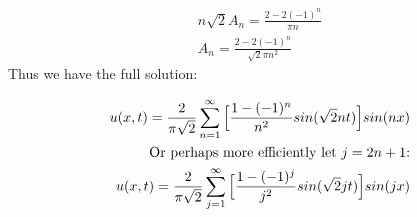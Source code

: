 \documentclass{article}
\begin{document}
\begin{equation}
\begin{aligned}
n\sqrt{2}A_n  = \frac{2- 2(-1)^n}{\pi n}\\
A_n = \frac{2- 2(-1)^n}{\sqrt{2}\pi n^2}
\end{aligned}
\end{equation}
Thus we have the full solution:
\begin{tcolorbox}[minipage,colback=white,arc=0pt,outer arc=0pt]
\begin{equation}
\begin{aligned}
u(x,t) = \frac{2}{\pi\sqrt{2}}\sum^{\infty}_{n=1}\Big{[}\frac{1-(-1)^n}{n^2}sin(\sqrt{2}nt)\Big{]}sin(nx)\\
\text{Or perhaps more efficiently let $j=2n+1$:}\\
u(x,t) = \frac{2}{\pi\sqrt{2}}\sum^{\infty}_{j=1}\Big{[}\frac{1-(-1)^j}{j^2}sin(\sqrt{2}jt)\Big{]}sin(jx)\\
\end{aligned}
\end{equation}
\end{tcolorbox}
\end{document}
